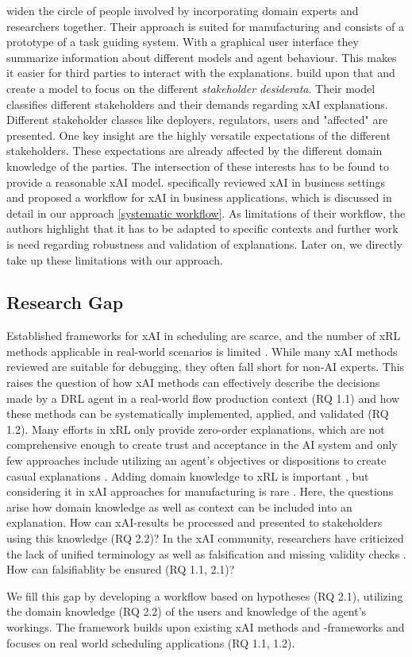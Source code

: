  widen the circle of people involved by incorporating domain experts and researchers together. Their approach is suited for manufacturing and consists of a prototype of a task guiding system. With a graphical user interface they summarize information about different models and agent behaviour. This makes it easier for third parties to interact with the explanations.  build upon that and create a model to focus on the different \textit{stakeholder desiderata}. Their model classifies different stakeholders and their demands regarding xAI explanations. Different stakeholder classes like deployers, regulators, users and "affected" are presented. One key insight are the highly versatile expectations of the different stakeholders. These expectations are already affected by the different domain knowledge of the parties. The intersection of these interests has to be found to provide a reasonable xAI model.
 specifically reviewed xAI in business settings and proposed a workflow for xAI in business applications, which is discussed in detail in our approach \ref{systematic workflow}. As limitations of their workflow, the authors highlight that it has to be adapted to specific contexts and further work is need regarding robustness and validation of explanations. Later on, we directly take up these limitations with our approach.

\subsection{Research Gap}
Established frameworks for xAI in scheduling are scarce, and the number of xRL methods applicable in real-world scenarios is limited . While many xAI methods reviewed are suitable for debugging, they often fall short for non-AI experts. This raises the question of how xAI methods can effectively describe the decisions made by a DRL agent in a real-world flow production context (RQ 1.1) and how these methods can be systematically implemented, applied, and validated (RQ 1.2).
Many efforts in xRL only provide zero-order explanations, which are not comprehensive enough to create trust and acceptance in the AI system and only few approaches include utilizing an agent's objectives or dispositions to create casual explanations . Adding domain knowledge to xRL is important , but considering it in xAI approaches for manufacturing is rare . Here, the questions arise how domain knowledge as well as context can be included into an explanation. How can xAI-results be processed and presented to stakeholders using this knowledge (RQ 2.2)?
In the xAI community, researchers have criticized the lack of unified terminology  as well as falsification and missing validity checks . How can falsifiablity be ensured (RQ 1.1, 2.1)?

We fill this gap by developing a workflow based on hypotheses (RQ 2.1), utilizing the domain knowledge (RQ 2.2) of the users and knowledge of the agent's workings. The framework builds upon existing xAI methods and -frameworks and focuses on real world scheduling applications (RQ 1.1, 1.2).
